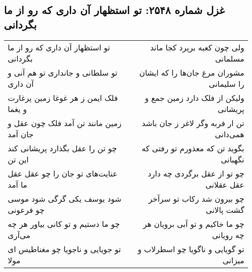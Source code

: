 \begin{center}
\section*{غزل شماره ۲۵۴۸: تو استظهار آن داری که رو از ما بگردانی}
\label{sec:2548}
\begin{longtable}{l p{0.5cm} r}
تو استظهار آن داری که رو از ما بگردانی
&&
ولی چون کعبه برپرد کجا ماند مسلمانی
\\
تو سلطانی و جانداری تو هم آنی و آن داری
&&
مشوران مرغ جان‌ها را که ایشان را سلیمانی
\\
فلک ایمن ز هر غوغا زمین پرغارت و یغما
&&
ولیکن از فلک دارد زمین جمع و پریشانی
\\
زمین مانند تن آمد فلک چون عقل و جان آمد
&&
تن ار فربه وگر لاغر ز جان باشد همی‌دانی
\\
چو تن را عقل بگذارد پریشانی کند این تن
&&
بگوید تن که معذورم تو رفتی که نگهبانی
\\
عنایت‌های تو جان را چو عقل عقل ما آمد
&&
چو تو از عقل برگردی چه دارد عقل عقلانی
\\
شود یوسف یکی گرگی شود موسی چو فرعونی
&&
چو بیرون شد رکاب تو سرآخر گشت پالانی
\\
چو ما دستیم و تو کانی بیاور هر چه می‌آری
&&
چو ما خاکیم و تو آبی برویان هر چه رویانی
\\
تو جویایی و ناجویا چو مغناطیس ای مولا
&&
تو گویایی و ناگویا چو اسطرلاب و میزانی
\\
\end{longtable}
\end{center}

